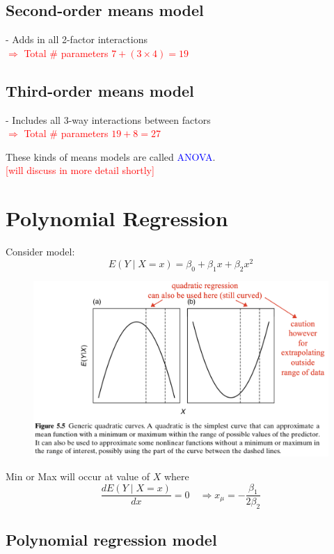 \documentclass[14pt]{extarticle}
\begin{document}
\subsection*{Second-order means model}
 - Adds in all 2-factor interactions\\
\textcolor{red}{$\Rightarrow$ Total \# parameters $7 + (3 \times 4) = 19$}\\

\subsection*{Third-order means model}
 - Includes all 3-way interactions between factors \\
\textcolor{red}{$\Rightarrow$ Total \# parameters $19 + 8 = 27$}
\vspace{1.5cm}

\noindent
These kinds of means models are called \textcolor{blue}{ANOVA}.\\
\textcolor{red}{[will discuss in more detail shortly]}

\newpage

\section*{Polynomial Regression}

Consider model:
\[
E(Y \mid X = x) = \beta_0 + \beta_1 x + \beta_2 x^2
\]
\begin{figure}[H]
    \centering
    \includegraphics[width=1\textwidth]{fig30.png}
\end{figure}
\noindent
Min or Max will occur at value of $X$ where
\[
\frac{dE(Y \mid X = x)}{dx} = 0 \quad 
\Rightarrow x_{\mu} = -\frac{\beta_1}{2 \beta_2}
\]

\subsection*{Polynomial regression model}
\end{document}
